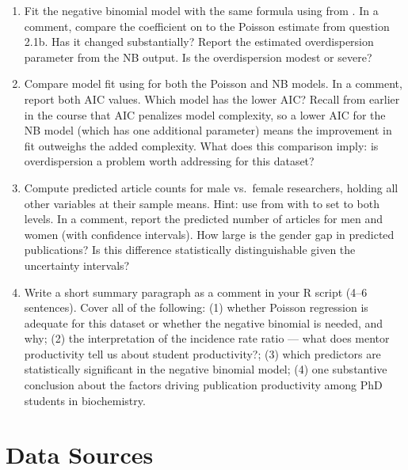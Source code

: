 \begin{enumerate}[label=\alph*)]

  \item Fit the negative binomial model with the same formula using  from . In a comment, compare the coefficient on  to the Poisson estimate from question 2.1b. Has it changed substantially? Report the estimated overdispersion parameter  from the NB output. Is the overdispersion modest or severe?

  \item Compare model fit using  for both the Poisson and NB models. In a comment, report both AIC values. Which model has the lower AIC? Recall from earlier in the course that AIC penalizes model complexity, so a lower AIC for the NB model (which has one additional parameter) means the improvement in fit outweighs the added complexity. What does this comparison imply: is overdispersion a problem worth addressing for this dataset?

  \item Compute predicted article counts for male vs.\ female researchers, holding all other variables at their sample means. Hint: use  from  with  to set  to both levels. In a comment, report the predicted number of articles for men and women (with confidence intervals). How large is the gender gap in predicted publications? Is this difference statistically distinguishable given the uncertainty intervals?

  \item Write a short summary paragraph as a comment in your R script (4--6 sentences). Cover all of the following: (1) whether Poisson regression is adequate for this dataset or whether the negative binomial is needed, and why; (2) the interpretation of the  incidence rate ratio --- what does mentor productivity tell us about student productivity?; (3) which predictors are statistically significant in the negative binomial model; (4) one substantive conclusion about the factors driving publication productivity among PhD students in biochemistry.

\end{enumerate}

\vspace{15pt}

\section{Data Sources}

